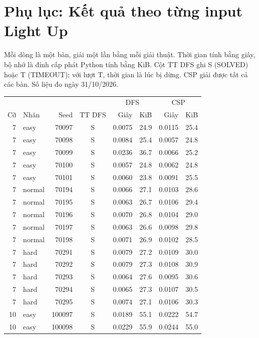 \clearpage
\section*{Phụ lục: Kết quả theo từng input Light Up}
Mỗi dòng là một bàn, giải một lần bằng mỗi giải thuật. Thời gian tính bằng
giây, bộ nhớ là đỉnh cấp phát Python tính bằng KiB. Cột TT DFS ghi S (SOLVED)
hoặc T (TIMEOUT); với lượt T, thời gian là lúc bị dừng. CSP giải được tất cả
các bàn. Số liệu đo ngày 31/10/2026.

\begin{table}[H]\centering\small
\setlength{\tabcolsep}{4pt}
\begin{tabular*}{\textwidth}{@{\extracolsep{\fill}}rlrcrrrr@{}}\toprule
 & & & & \multicolumn{2}{c}{DFS} & \multicolumn{2}{c}{CSP}\\
Cỡ & Nhãn & Seed & TT DFS & Giây & KiB & Giây & KiB\\\midrule
7 & easy & 70097 & S & 0.0075 & 24.9 & 0.0115 & 25.4\\
7 & easy & 70098 & S & 0.0084 & 25.4 & 0.0057 & 24.8\\
7 & easy & 70099 & S & 0.0236 & 36.7 & 0.0066 & 25.2\\
7 & easy & 70100 & S & 0.0057 & 24.8 & 0.0062 & 24.8\\
7 & easy & 70101 & S & 0.0060 & 23.8 & 0.0091 & 25.5\\
7 & normal & 70194 & S & 0.0066 & 27.1 & 0.0103 & 28.6\\
7 & normal & 70195 & S & 0.0063 & 26.7 & 0.0106 & 29.4\\
7 & normal & 70196 & S & 0.0070 & 26.8 & 0.0104 & 29.0\\
7 & normal & 70197 & S & 0.0063 & 26.6 & 0.0098 & 29.8\\
7 & normal & 70198 & S & 0.0071 & 26.9 & 0.0102 & 28.5\\
7 & hard & 70291 & S & 0.0079 & 27.2 & 0.0109 & 30.0\\
7 & hard & 70292 & S & 0.0079 & 27.3 & 0.0108 & 30.9\\
7 & hard & 70293 & S & 0.0064 & 27.6 & 0.0095 & 30.6\\
7 & hard & 70294 & S & 0.0065 & 27.3 & 0.0107 & 30.5\\
7 & hard & 70295 & S & 0.0074 & 27.1 & 0.0106 & 30.3\\
10 & easy & 100097 & S & 0.0189 & 55.1 & 0.0222 & 54.7\\
10 & easy & 100098 & S & 0.0229 & 55.9 & 0.0244 & 55.0\\

\end{tabular*}
\end{table}
